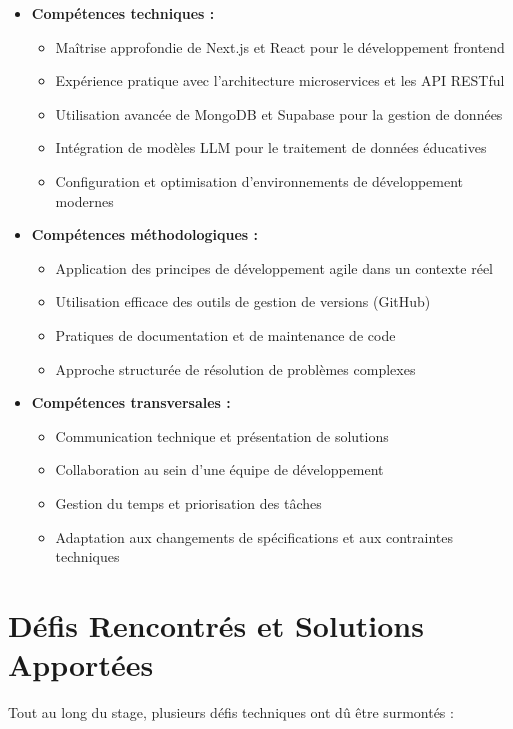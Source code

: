 \documentclass[12pt, a4paper]{report}
\begin{document}
\begin{itemize}
  \item \textbf{Compétences techniques :}
  \begin{itemize}
    \item Maîtrise approfondie de Next.js et React pour le développement frontend
    \item Expérience pratique avec l'architecture microservices et les API RESTful
    \item Utilisation avancée de MongoDB et Supabase pour la gestion de données
    \item Intégration de modèles LLM pour le traitement de données éducatives
    \item Configuration et optimisation d'environnements de développement modernes
  \end{itemize}
  
  \item \textbf{Compétences méthodologiques :}
  \begin{itemize}
    \item Application des principes de développement agile dans un contexte réel
    \item Utilisation efficace des outils de gestion de versions (GitHub)
    \item Pratiques de documentation et de maintenance de code
    \item Approche structurée de résolution de problèmes complexes
  \end{itemize}
  
  \item \textbf{Compétences transversales :}
  \begin{itemize}
    \item Communication technique et présentation de solutions
    \item Collaboration au sein d'une équipe de développement
    \item Gestion du temps et priorisation des tâches
    \item Adaptation aux changements de spécifications et aux contraintes techniques
  \end{itemize}
\end{itemize}

\section{Défis Rencontrés et Solutions Apportées}

Tout au long du stage, plusieurs défis techniques ont dû être surmontés :
\end{document}
